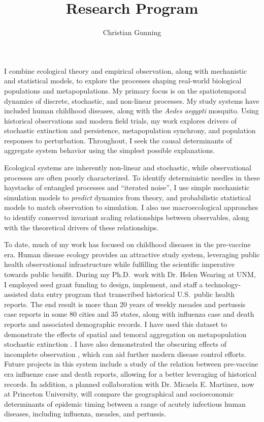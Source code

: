 \documentclass[12pt]{article}
\author{Christian Gunning}
\title{Research Program}
\begin{document}
\maketitle
\thispagestyle{empty}
\linespread{1.25}\selectfont

I combine ecological theory and empirical observation, along with mechanistic
and statistical models, to explore the processes shaping real-world biological
populations and metapopulations.  My primary focus is on the spatiotemporal
dynamics of discrete, stochastic, and non-linear processes.  My study systems
have included human childhood diseases, along with the {\em Aedes aegypti}
mosquito.  Using historical observations and modern field trials, my work
explores drivers of stochastic extinction and persistence, metapopulation
synchrony, and population responses to perturbation.  Throughout, I seek the
causal determinants of aggregate system behavior using the simplest possible
explanations.

Ecological systems are inherently non-linear and stochastic, while observational
processes are often poorly characterized.  To identify deterministic needles in
these haystacks of entangled processes and ``iterated noise'', I use simple
mechanistic simulation models to {\em predict} dynamics from theory, and
probabilistic statistical models to match observation to simulation.  I also use
macroecological approaches to identify conserved invariant scaling relationships
between observables, along with the theoretical drivers of these relationships.

To date, much of my work has focused on childhood diseases in the pre-vaccine
era. Human disease ecology provides an attractive study system, leveraging
public health observational infrastructure while fulfilling the scientific
imperative towards public benifit.  During my Ph.D.\ work with Dr. Helen Wearing
at UNM, I employed seed grant funding to design, implement, and staff a
technology-assisted data entry program that transcribed historical U.S.\ public
health reports. The end result is more than 20 years of weekly measles and
pertussis case reports in some 80 cities and 35 states, along with influenza
case and death reports and associated demographic records.  I have used this
dataset to demonstrate the effects of spatial and temoral aggregation on
metapopulation stochastic extinction \citep{gunning2013probabilistic}. I have
also demonstrated the obscuring effects of incomplete observation
\citep{gunning2014conserved}, which can aid further modern disease control
efforts.  Future projects in this system include a study of the relation between
pre-vaccine era influenze case and death reports, allowing for a better
leveraging of historical records. In addition, a planned collaboration with Dr.
Micaela E. Martinez, now at Princeton University, will compare the geographical
and socioeconomic determinants of epidemic timing between a range of acutely
infectious human diseases, including influenza, measles, and pertussis.
\end{document}
